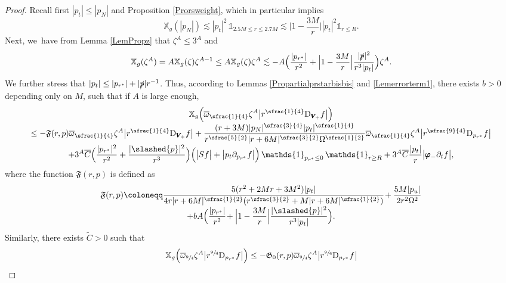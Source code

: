 \documentclass[10pt]{amsart}
\theoremstyle{plain}
\theoremstyle{definition}
\newcommand\z{{\zeta}}
\newcommand\T{{\mathbb{X}}}
\begin{document}
\begin{proof}
Recall first $|p_t| \leq |p_N|$ and Proposition \ref{Prorsweight}, which in particular implies\vspace*{-3pt}\enlargethispage{.5\baselineskip}
\[
\T_g(|p_N|) \lesssim |p_t|^2 \, \mathds{1}_{2.5M \leq r \leq 2.7M} \lesssim \Big| 1-\frac{3M}{r} \Big| |p_t|^2 \mathds{1}_{r \leq R}.
\]
Next, we~have from Lemma \ref{LemPropz} that $\z^A \leq 3^A$ and\vspace*{-3pt}
\[
\T_g (\z^A) = A \T_g(\z) \z^{A-1} \leq A \T_g(\z) \z^{A} \lesssim -A\Bigl(\frac{|p_{r^*}|}{r^2}+ \Bigl |1-\frac{3M}{r} \Bigr | \frac{|\slashed{p}|^2}{r^3|p_t|} \Bigr) \z^A.
\]
We further stress that $|p_t| \leq |p_{r^*}|+|\slashed{p}|r^{-1}$. Thus, according to Lemmas \ref{Propartialprstarbisbis} and \ref{Lemerrorterm1}, there exists $b>0$ depending only on $M$, such that if $A$ is large enough,\vspace*{-5pt}
\begin{multline*}
 \T_g \Bigl(\overline{\omega}_{\sfrac{1}{4}} \z^A \big| r^{\sfrac{1}{4}}\mathrm{D}_{\pmb{V}_{\!+}} f \big| \Bigr) \\[-3pt]
\leq - \mathfrak{F}(r,p) \overline{\omega}_{\sfrac{1}{4}} \z^A \big| r^{\sfrac{1}{4}}\mathrm{D}_{\pmb{V}_{\!+}} f \big| + \frac{(r+3M)|p_N|^{\sfrac{3}{4}} |p_t|^{\sfrac{1}{4}} }{r^{\sfrac{5}{2}}|r+6M|^{\sfrac{3}{2}}\Omega^{\sfrac{1}{2}}} \overline{\omega}_{\sfrac{1}{4}} \z^A \big|r^{\sfrac{9}{4}} \mathrm{D}_{p_{r^*}}f \big| \\[-3pt]
+ 3^A\overline{C}\Bigl(\frac{|p_{r^*}|^2}{r^2 }+ \frac{|\slashed{p}|^2}{r^3 } \Bigr) \Bigl(\big|Sf \big|+ \big|p_t \partial_{p_{r^*}} f\big| \Bigr) \, \mathds{1}_{p_{r^*} \leq 0} \, \mathds{1}_{r \geq R}+3^A\overline{C}\frac{|p_t|}{r}\big| \pmb{\varphi}_- \partial_t f \big|,
\end{multline*}
where the function $\mathfrak{F}(r,p)$ is defined as\vspace*{-5pt}
\begin{multline*}
\mathfrak{F}(r,p) \coloneqq \frac{5(r^2+2Mr+3M^2)|p_t|}{4r|r+6M|^{\sfrac{1}{2}}(r^{\sfrac{3}{2}}+M|r+6M|^{\sfrac{1}{2}}) } \! +\frac{5M|p_u|}{2r^2\Omega^2} \\[-3pt]
+ bA \Bigl(\frac{|p_{r^*}|}{r^2} \! + \Bigl |1-\frac{3M}{r} \Bigr| \frac{|\slashed{p}|^2}{r^3|p_t|} \Bigr).
\end{multline*}
Similarly, there exists $\widetilde{C}>0$ such that\vspace*{-5pt}
\begin{multline*}
\T_g \Bigl(\overline{\omega}_{\sfrac{9}{4}} \z^A \big|r^{\sfrac{9}{4}} \mathrm{D }_{p_{r^*}} f \big| \Bigr) \leq - \mathfrak{G}_0(r,p) \overline{\omega}_{\sfrac{9}{4}} \z^A \big|r^{\sfrac{9}{4}} \mathrm{D }_{p_{r^*}} f \big|\\

\end{multline*}
\end{proof}
\end{document}
